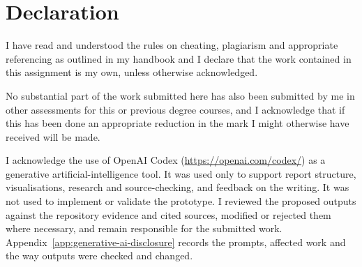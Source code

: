 \chapter*{Declaration}

I have read and understood the rules on cheating, plagiarism and appropriate referencing as outlined in my handbook and I declare that the work contained in this assignment is my own, unless otherwise acknowledged.

No substantial part of the work submitted here has also been submitted by me in other assessments for this or previous degree courses, and I acknowledge that if this has been done an appropriate reduction in the mark I might otherwise have received will be made.

I acknowledge the use of OpenAI Codex (\url{https://openai.com/codex/}) as a generative artificial-intelligence tool. It was used only to support report structure, visualisations, research and source-checking, and feedback on the writing. It was not used to implement or validate the prototype. I reviewed the proposed outputs against the repository evidence and cited sources, modified or rejected them where necessary, and remain responsible for the submitted work. Appendix~\ref{app:generative-ai-disclosure} records the prompts, affected work and the way outputs were checked and changed.

